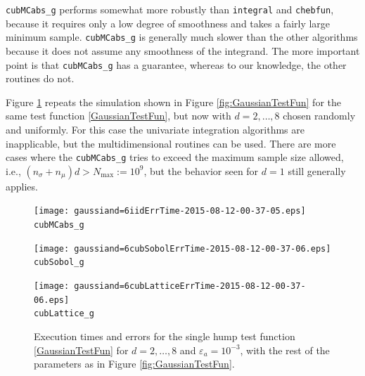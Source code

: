 \documentclass{iitthesis}
\theoremstyle{definition}
\begin{document}
 {\tt cubMCabs\_g}  performs somewhat more robustly than {\tt integral} and {\tt chebfun}, because it requires only a low degree of smoothness and takes a fairly large minimum sample.  {\tt cubMCabs\_g} is generally much slower than the other algorithms because it does not assume any smoothness of the integrand. The more important point is that  {\tt cubMCabs\_g}  has a guarantee, whereas to our knowledge, the other routines do not.
%
%

Figure \ref{fig:GaussianTestFunHD} repeats the simulation shown in Figure \ref{fig:GaussianTestFun} for the same test function \eqref{GaussianTestFun}, but now with $d=2, \ldots, 8$ chosen randomly and uniformly.  For this case the univariate integration algorithms are inapplicable, but the multidimensional routines can be used.  There are more cases where the {\tt cubMCabs\_g} tries to exceed the maximum sample size allowed, i.e., $(n_{\sigma}+n_\mu)d > N_{\max}:=10^9$, but the behavior seen for $d=1$ still generally applies.  

\begin{figure}
\centering
\begin{minipage}{9cm} \centering \texttt{[image: gaussiand=6iidErrTime-2015-08-12-00-37-05.eps]} \\ {\tt cubMCabs\_g} \end{minipage}
\begin{minipage}{7cm} \centering \texttt{[image: gaussiand=6cubSobolErrTime-2015-08-12-00-37-06.eps]} \\ {\tt cubSobol\_g} \end{minipage}
\begin{minipage}{7cm} \centering \texttt{[image: gaussiand=6cubLatticeErrTime-2015-08-12-00-37-06.eps]} \\ {\tt cubLattice\_g} \end{minipage}
\caption{Execution times and errors for the single hump test function \eqref{GaussianTestFun} for $d=2, \ldots, 8$ and $\varepsilon_a=10^{-3}$, with the rest of the parameters as in Figure \ref{fig:GaussianTestFun}.\label{fig:GaussianTestFunHD}}
\end{figure}
\end{document}

